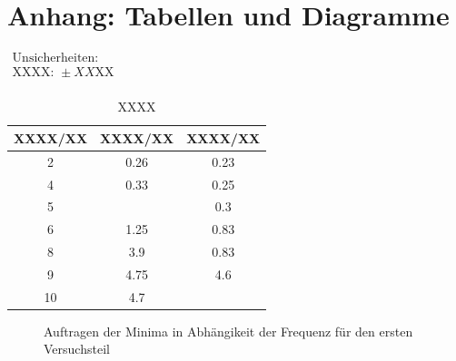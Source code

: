 \documentclass[11pt,a4paper]{article}
\begin{document}
\section{Anhang: Tabellen und Diagramme}

\begin{table}[h]
\centering
\caption{XXXX} \vspace{11pt}
$\begin{array}{l}
\textrm{Unsicherheiten:}\\
\textrm{XXXX: } \pm XX \textrm{XX}\\
\end{array}$
\begin{tabular}{ccc}
\toprule
\textrm{XXXX}/\textrm{XX} & \textrm{XXXX}/\textrm{XX} & \textrm{XXXX}/\textrm{XX} \\
\midrule 
2 & 0.26 & 0.23\\
\hline
4 & 0.33 & 0.25\\
\hline 
5 & & 0.3\\
\hline 
6 & 1.25 & 0.83\\
\hline 
8 & 3.9 & 0.83\\ 
\hline
9 & 4.75 & 4.6\\ 
\hline
10 & 4.7 &\\ 
\bottomrule
\end{tabular}
\label{Tab:X}
\end{table}

\begin{figure}[p]
\centering
{}
\renewcommand\thefigure{3}
\caption[Auftragen der Minima in Abh\"angikeit der Frequenz f\"ur den ersten Versuchsteil]{Auftragen der Minima in Abh\"angikeit der Frequenz f\"ur den ersten Versuchsteil}
\label{Abb:3}
\end{figure}
\end{document}
